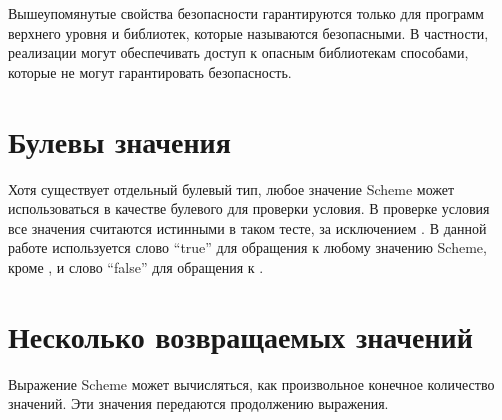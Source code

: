 Вышеупомянутые свойства безопасности гарантируются только для программ верхнего уровня и
библиотек, которые называются безопасными. В частности, реализации могут обеспечивать
доступ к опасным библиотекам способами, которые не могут гарантировать безопасность.\vspace{-2mm}

\section{Булевы значения}\vspace{-1mm}
\label{booleanvaluessection}

Хотя существует отдельный булевый тип, любое значение Scheme может использоваться в качестве
булевого для проверки условия. В проверке условия все значения считаются истинными в таком тесте,
за исключением {\bfseries\schfalse{}}. В данной работе используется слово ``true'' для обращения
к любому значению Scheme, кроме {\bfseries\schfalse{}}, и слово ``false'' для обращения к
{\bfseries\schfalse{}}. \vspace{-2mm}

\section{Несколько возвращаемых значений}\vspace{-1mm}
\label{multiplereturnvaluessection}

Выражение Scheme может вычисляться, как произвольное конечное количество значений. Эти значения
передаются продолжению выражения.

